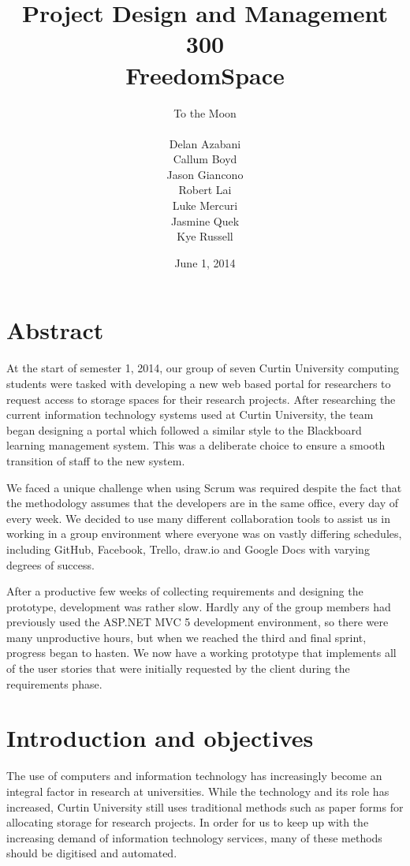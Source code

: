 \documentclass[a4paper,titlepage,12pt]{article}
\title{Project Design and Management 300\\FreedomSpace}
\date{June 1, 2014}
\author{
	To the Moon \\
	\hspace{10 mm} \\
	Delan Azabani \\
	Callum Boyd \\
	Jason Giancono \\
	Robert Lai \\
	Luke Mercuri \\
	Jasmine Quek \\
	Kye Russell \\
}
\let\stdsection\section
\renewcommand\section{\newpage\stdsection}
\begin{document}
\maketitle
{}
\tableofcontents
\listoffigures
{}

\section{Abstract}

At the start of semester 1, 2014, our group of seven Curtin University
computing students were tasked with developing a new web based portal for
researchers to request access to storage spaces for their research projects.
After researching the current information technology systems used at Curtin
University, the team began designing a portal which followed a similar style to
the Blackboard learning management system. This was a deliberate choice to
ensure a smooth transition of staff to the new system.

We faced a unique challenge when using Scrum was required despite the fact that
the methodology assumes that the developers are in the same office, every day
of every week. We decided to use many different collaboration tools to assist
us in working in a group environment where everyone was on vastly differing
schedules, including GitHub, Facebook, Trello, draw.io and Google Docs with
varying degrees of success.

After a productive few weeks of collecting requirements and designing the
prototype, development was rather slow. Hardly any of the group members had
previously used the ASP.NET MVC 5 development environment, so there were many
unproductive hours, but when we reached the third and final sprint, progress
began to hasten. We now have a working prototype that implements all of the
user stories that were initially requested by the client during the
requirements phase.

\section{Introduction and objectives}

The use of computers and information technology has increasingly become an
integral factor in research at universities. While the technology and its role
has increased, Curtin University still uses traditional methods such as paper
forms for allocating storage for research projects. In order for us to keep up
with the increasing demand of information technology services, many of these
methods should be digitised and automated.
\end{document}
